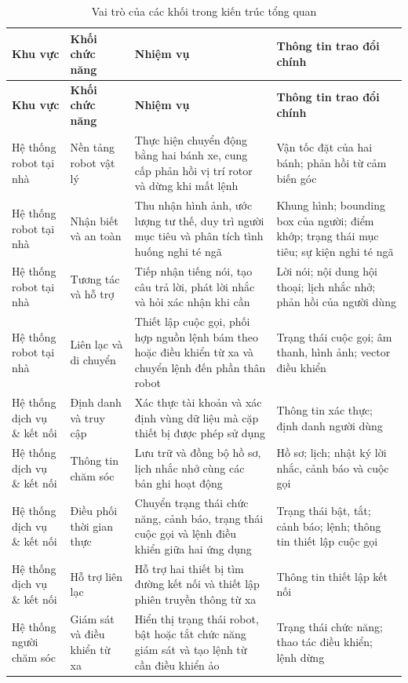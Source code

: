 \begin{longtable}{|p{2.7cm}|p{3.4cm}|p{4.2cm}|p{3.3cm}|}
\caption{Vai trò của các khối trong kiến trúc tổng quan}\label{tab:logical_modules}\\
\hline
\textbf{Khu vực} & \textbf{Khối chức năng} & \textbf{Nhiệm vụ} & \textbf{Thông tin trao đổi chính} \\
\hline
\endfirsthead
\hline
\textbf{Khu vực} & \textbf{Khối chức năng} & \textbf{Nhiệm vụ} & \textbf{Thông tin trao đổi chính} \\
\hline
\endhead
Hệ thống robot tại nhà & Nền tảng robot vật lý & Thực hiện chuyển động bằng hai bánh xe, cung cấp phản hồi vị trí rotor và dừng khi mất lệnh & Vận tốc đặt của hai bánh; phản hồi từ cảm biến góc \\
\hline
Hệ thống robot tại nhà & Nhận biết và an toàn & Thu nhận hình ảnh, ước lượng tư thế, duy trì người mục tiêu và phân tích tình huống nghi té ngã & Khung hình; bounding box của người; điểm khớp; trạng thái mục tiêu; sự kiện nghi té ngã \\
\hline
Hệ thống robot tại nhà & Tương tác và hỗ trợ & Tiếp nhận tiếng nói, tạo câu trả lời, phát lời nhắc và hỏi xác nhận khi cần & Lời nói; nội dung hội thoại; lịch nhắc nhở; phản hồi của người dùng \\
\hline
Hệ thống robot tại nhà & Liên lạc và di chuyển & Thiết lập cuộc gọi, phối hợp nguồn lệnh bám theo hoặc điều khiển từ xa và chuyển lệnh đến phần thân robot & Trạng thái cuộc gọi; âm thanh, hình ảnh; vector điều khiển \\
\hline
Hệ thống dịch vụ \& kết nối & Định danh và truy cập & Xác thực tài khoản và xác định vùng dữ liệu mà cặp thiết bị được phép sử dụng & Thông tin xác thực; định danh người dùng \\
\hline
Hệ thống dịch vụ \& kết nối & Thông tin chăm sóc & Lưu trữ và đồng bộ hồ sơ, lịch nhắc nhở cùng các bản ghi hoạt động & Hồ sơ; lịch; nhật ký lời nhắc, cảnh báo và cuộc gọi \\
\hline
Hệ thống dịch vụ \& kết nối & Điều phối thời gian thực & Chuyển trạng thái chức năng, cảnh báo, trạng thái cuộc gọi và lệnh điều khiển giữa hai ứng dụng & Trạng thái bật, tắt; cảnh báo; lệnh; thông tin thiết lập cuộc gọi \\
\hline
Hệ thống dịch vụ \& kết nối & Hỗ trợ liên lạc & Hỗ trợ hai thiết bị tìm đường kết nối và thiết lập phiên truyền thông từ xa & Thông tin thiết lập kết nối \\
\hline
Hệ thống người chăm sóc & Giám sát và điều khiển từ xa & Hiển thị trạng thái robot, bật hoặc tắt chức năng giám sát và tạo lệnh từ cần điều khiển ảo & Trạng thái chức năng; thao tác điều khiển; lệnh dừng \\

\end{longtable}
